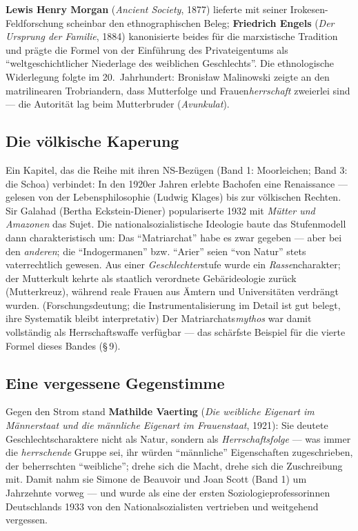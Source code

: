 \documentclass[11pt,a4paper,ngerman]{scrartcl}
\newcommand{\chipbase}[2]{\hspace{0pt}{\footnotesize\textcolor{#1}{[\textsc{#2}]}}}
\newcommand{\chipbelegt}[1]{\chipbase{chipgreen}{#1}}
\newcommand{\chipplausibel}[1]{\chipbase{chipamber}{#1}}
\begin{document}
\textbf{Lewis Henry Morgan} (\emph{Ancient Society}, 1877) lieferte mit seiner Irokesen-Feldforschung scheinbar den ethnographischen Beleg; \textbf{Friedrich Engels} (\emph{Der Ursprung der Familie}, 1884) kanonisierte beides für die marxistische Tradition und prägte die Formel von der Einführung des Privateigentums als \enquote{weltgeschichtlicher Niederlage des weiblichen Geschlechts}. \chipbelegt{belegt} Die ethnologische Widerlegung folgte im 20.~Jahrhundert: Bronis\l{}aw Malinowski zeigte an den matrilinearen Trobriandern, dass Mutterfolge und Frauen\emph{herrschaft} zweierlei sind --- die Autorität lag beim Mutterbruder (\emph{Avunkulat}). \chipbelegt{belegt}

\subsection*{Die völkische Kaperung}
Ein Kapitel, das die Reihe mit ihren NS-Bezügen (Band 1: Moorleichen; Band 3: die Schoa) verbindet: In den 1920er Jahren erlebte Bachofen eine Renaissance --- gelesen von der Lebensphilosophie (Ludwig Klages) bis zur völkischen Rechten. Sir Galahad (Bertha Eckstein-Diener) populariserte 1932 mit \emph{Mütter und Amazonen} das Sujet. Die nationalsozialistische Ideologie baute das Stufenmodell dann charakteristisch um: Das \enquote{Matriarchat} habe es zwar gegeben --- aber bei den \emph{anderen}; die \enquote{Indogermanen} bzw. \enquote{Arier} seien \enquote{von Natur} stets vaterrechtlich gewesen. Aus einer \emph{Geschlechter}stufe wurde ein \emph{Rasse}ncharakter; der Mutterkult kehrte als staatlich verordnete Gebärideologie zurück (Mutterkreuz), während reale Frauen aus Ämtern und Universitäten verdrängt wurden. \chipplausibel{plausibel} (Forschungsdeutung; die Instrumentalisierung im Detail ist gut belegt, ihre Systematik bleibt interpretativ) Der Matriarchats\emph{mythos} war damit vollständig als Herrschaftswaffe verfügbar --- das schärfste Beispiel für die vierte Formel dieses Bandes (§\,9).

\subsection*{Eine vergessene Gegenstimme}
Gegen den Strom stand \textbf{Mathilde Vaerting} (\emph{Die weibliche Eigenart im Männerstaat und die männliche Eigenart im Frauenstaat}, 1921): Sie deutete Geschlechtscharaktere nicht als Natur, sondern als \emph{Herrschaftsfolge} --- was immer die \emph{herrschende} Gruppe sei, ihr würden \enquote{männliche} Eigenschaften zugeschrieben, der beherrschten \enquote{weibliche}; drehe sich die Macht, drehe sich die Zuschreibung mit. Damit nahm sie Simone de Beauvoir und Joan Scott (Band 1) um Jahrzehnte vorweg --- und wurde als eine der ersten Soziologieprofessorinnen Deutschlands 1933 von den Nationalsozialisten vertrieben und weitgehend vergessen. \chipbelegt{belegt}
\end{document}
